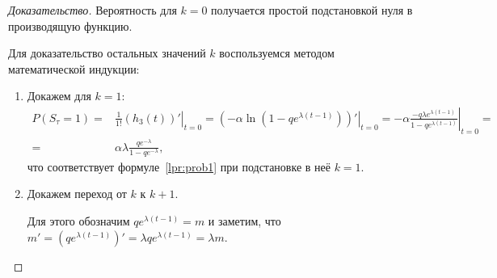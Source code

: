 \documentclass[12pt, specialist, subf, substylefile = spbu.rtx]{disser}
\begin{document}
	\begin{proof}[Доказательство]
		Вероятность для $k = 0$ получается простой подстановкой нуля в производящую функцию.
		
		Для доказательство остальных значений $k$ воспользуемся методом математической индукции:
		
		\begin{enumerate}
			\item Докажем для $k = 1$:
			\[
				\begin{aligned}
					P (S _\tau = 1) =& \left.\frac 1 {1 !} \left(h _3(t)\right)'\right| _{t = 0} = \left.\left(-\alpha \ln \left(1 - q e ^{\lambda (t - 1)}\right)\right)'\right| _{t = 0} = \left.-\alpha \frac {-q \lambda e ^{\lambda (t - 1)}} {1 - q e ^{\lambda (t - 1)}} \right| _{t = 0} =\\
					=& \alpha \lambda \frac {q e ^{-\lambda}} {1 - q e ^{-\lambda}},
				\end{aligned}
			\]
			что соответствует формуле~\eqref{lpr:prob1} при подстановке в неё $k = 1$.
			
			\item Докажем переход от $k$ к $k + 1$.
			
			Для этого обозначим $q e ^{\lambda (t - 1)} = m$ и заметим, что $m' = \left(q e ^{\lambda(t - 1)}\right)' = \lambda q e ^{\lambda(t - 1)} = \lambda m $.
			

\end{enumerate}
\end{proof}
\end{document}
